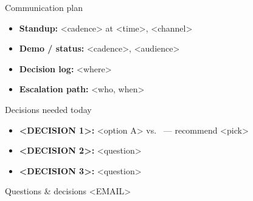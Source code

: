 \documentclass[aspectratio=169,12pt]{beamer}
\begin{document}
\begin{frame}{Communication plan}
  \begin{itemize}
    \item \textbf{Standup:} <cadence> at <time>, <channel>
    \item \textbf{Demo / status:} <cadence>, <audience>
    \item \textbf{Decision log:} <where>
    \item \textbf{Escalation path:} <who, when>
  \end{itemize}
\end{frame}

\begin{frame}{Decisions needed today}
  \begin{itemize}
    \item \textbf{<DECISION 1>:} <option A> vs.\ <option B> --- recommend <pick>
    \item \textbf{<DECISION 2>:} <question>
    \item \textbf{<DECISION 3>:} <question>
  \end{itemize}
\end{frame}

\begin{frame}[plain]{Questions \& decisions}
  \vfill
  \centering
  \Large <EMAIL>
  \vfill
\end{frame}
\end{document}
